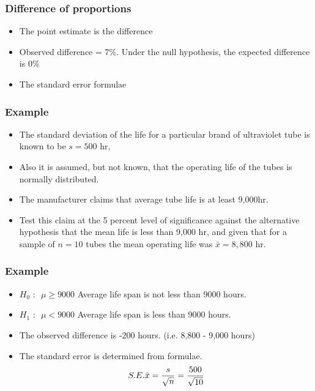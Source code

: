﻿\documentclass[a4]{beamer}
\begin{document}
\begin{frame}
\frametitle{Difference of proportions}
\large
\begin{itemize}
\item The point estimate is the difference 
\item Observed difference  = $7\%$. Under the null hypothesis, the expected difference is $0\%$
\item The standard error formulae
\end{itemize}
\end{frame}
\begin{frame}
\frametitle{Example}
\large
\begin{itemize}
\item The standard deviation of the life for a particular brand of ultraviolet tube is known to be $s = 500$ hr,
\item Also it is assumed, but not known, that the operating life of the tubes is normally distributed. \item The manufacturer claims that average tube life
is at least 9,000hr. \item Test this claim at the 5 percent level of significance against the alternative hypothesis
that the mean life is less than 9,000 hr, and given that for a sample of $n = 10$ tubes the mean operating
life was $\bar{x}  =  8,800$ hr.
\end{itemize}
\end{frame}

\begin{frame}
\frametitle{Example}
\large
\begin{itemize}
\item $H_0 \mbox{ : } $ $\mu \geq 9000$	Average life span is not less than 9000 hours.
\item $H_1 \mbox{ : } $ $\mu < 9000$    Average life span is  less than 9000 hours.
\end{itemize}
\bigskip
\begin{itemize}
\item The observed difference is -200 hours. (i.e. 8,800 - 9,000 hours)
\item The standard error is determined from formulae.
\[ S.E. \bar{x}  = {s \over \sqrt{n}} = {500 \over \sqrt{10}} \]
\end{itemize}
\end{frame}
\end{document}
